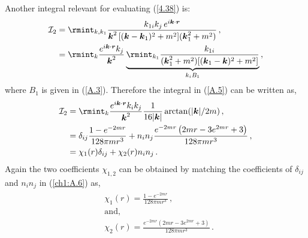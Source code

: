 Another integral relevant for evaluating (\ref{4.38}) is:
\begin{align}
    \begin{split}
         \mathcal{I}_2&= \rmint_{k,k_1}\frac{k_{1i}k_{j}\,e^{i\boldsymbol{k}\cdot \boldsymbol{r}}}{\boldsymbol{k}^2\,[(\boldsymbol{k}-\boldsymbol{k}_1)^2+m^2](\boldsymbol{k}_{1}^2+m^2)}\,,\\ &
         =\rmint_{k}\frac{e^{i\boldsymbol{k}\cdot \boldsymbol{r}}k_j}{\boldsymbol{k}^2}\underbrace{\rmint_{k_1}\frac{k_{1i}}{(\boldsymbol{k}_1^2+m^2)[(\boldsymbol{k}_1-\boldsymbol{k})^2+m^2]}}_{k_{i}B_{1}}\,,\label{A.5}
    \end{split}
\end{align}
where $B_1$ is given in (\ref{A.3}). Therefore the integral in (\ref{A.5}) can be written as,
\begin{align}
    \begin{split} \mathcal{I}_2&=\rmint_{k}\frac{e^{i\boldsymbol{k}\cdot \boldsymbol{r}}k_i k_j}{\boldsymbol{k}^2}\frac{1}{16|\boldsymbol{k}|}\arctan(|\boldsymbol{k}|/2m)\,,\\ &
    =\delta_{ij}\frac{1-e^{-2 m r}}{128 \pi  m r^3}+n_in_j\frac{e^{-2m r} \left(2m r-3 e^{2m r}+3\right)}{128 \pi  m r^3}\,,\\ &
    =\chi_1(r)\delta_{ij}+\chi_2(r)n_i n_j\,.
        \label{ch1:A.6}
    \end{split}
\end{align}
Again the two coefficients $\chi_{1,2}$ can be obtained by matching the coefficients of $\delta_{ij}$ and $n_i n_j$ in (\ref{ch1:A.6}) as,
\begin{align}
    \begin{split}
        &\chi_1(r)=\frac{1-e^{-2mr}}{128\pi m r^3}\,,\\ &
        \text{and,}\\ &
        \chi_2(r)=\frac{e^{-2mr}(2mr-3e^{2mr}+3)}{128\pi m r^3}\,.
    \end{split}
\end{align}
